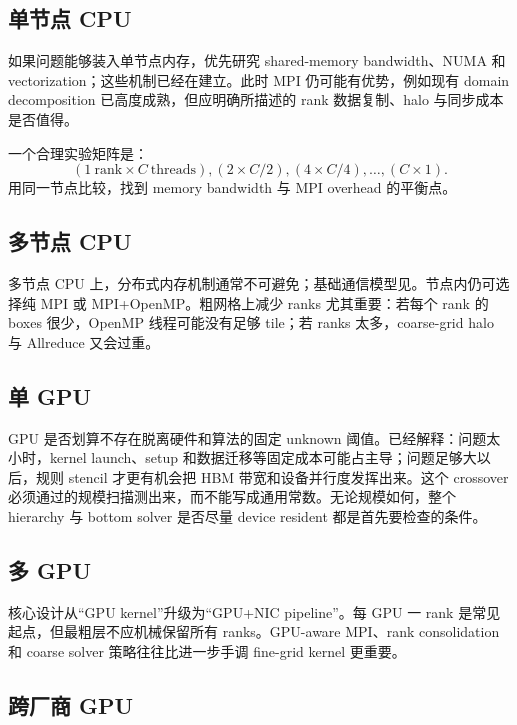 \subsection{单节点 CPU}

如果问题能够装入单节点内存，优先研究 shared-memory bandwidth、NUMA 和 vectorization；这些机制已经在建立。此时 MPI 仍可能有优势，例如现有 domain decomposition 已高度成熟，但应明确所描述的 rank 数据复制、halo 与同步成本是否值得。

一个合理实验矩阵是：
\begin{equation}
(1\ \text{rank}\times C\ \text{threads}),
(2\times C/2),
(4\times C/4),
\ldots,
(C\times1).
\end{equation}
用同一节点比较，找到 memory bandwidth 与 MPI overhead 的平衡点。

\subsection{多节点 CPU}

多节点 CPU 上，分布式内存机制通常不可避免；基础通信模型见。节点内仍可选择纯 MPI 或 MPI+OpenMP。粗网格上减少 ranks 尤其重要：若每个 rank 的 boxes 很少，OpenMP 线程可能没有足够 tile；若 ranks 太多，coarse-grid halo 与 Allreduce 又会过重。

\subsection{单 GPU}

GPU 是否划算不存在脱离硬件和算法的固定 unknown 阈值。已经解释：问题太小时，kernel launch、setup 和数据迁移等固定成本可能占主导；问题足够大以后，规则 stencil 才更有机会把 HBM 带宽和设备并行度发挥出来。这个 crossover 必须通过的规模扫描测出来，而不能写成通用常数。无论规模如何，整个 hierarchy 与 bottom solver 是否尽量 device resident 都是首先要检查的条件。

\subsection{多 GPU}

核心设计从“GPU kernel”升级为“GPU+NIC pipeline”。每 GPU 一 rank 是常见起点，但最粗层不应机械保留所有 ranks。GPU-aware MPI、rank consolidation 和 coarse solver 策略往往比进一步手调 fine-grid kernel 更重要。

\subsection{跨厂商 GPU}

